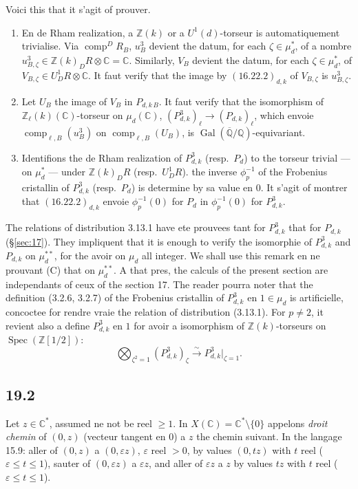 \documentclass[12pt,a4paper]{article}
\theoremstyle{plain}
\theoremstyle{definition}
\theoremstyle{remark}
\DeclareMathOperator{\Spec}{Spec}
\DeclareMathOperator{\Gal}{Gal}
\DeclareMathOperator{\comp}{comp}
\newcommand{\Betti}{B}
\newcommand{\dR}{DR}
\newcommand{\ZZ}{\mathbb{Z}}
\newcommand{\QQ}{\mathbb{Q}}
\newcommand{\CC}{\mathbb{C}}
\begin{document}
Voici this that it s'agit of prouver.
\begin{enumerate}
\item[(A)] En de Rham realization, a $\ZZ(k)$ or a
$U^1(d)$-torseur is automatiquement trivialise. Via
$\comp^\dR_\Betti$, $u^3_\Betti$ devient the datum, for each
$\zeta \in \mu_d^*$, of a nombre $u^3_{\Betti,\zeta} \in
\ZZ(k)_\dR \otimes \CC = \CC$. Similarly, $V_\Betti$ devient the
datum, for each $\zeta \in \mu_d^*$, of $V_{\Betti,\zeta} \in
U^1_\dR \otimes \CC$. It faut verify that the image by
$(16.22.2)_{d,k}$ of $V_{\Betti,\zeta}$ is $u^3_{\Betti,\zeta}$.
\item[(B)] Let $U_\Betti$ the image of $V_\Betti$ in
$P_{d,k\,\Betti}$. It faut verify that the isomorphism of
$\ZZ_\ell(k)(\CC)$-torseur on $\mu_d(\CC)$,
$(P^3_{d,k})_\ell \to (P_{d,k})_\ell$, which envoie
$\comp_{\ell,\Betti}(u^3_\Betti)$ on
$\comp_{\ell,\Betti}(U_\Betti)$, is $\Gal(\overline{\QQ}/\QQ)$-equivariant.
\item[(C)] Identifions the de Rham realization of $P^3_{d,k}$
(resp.\ $P_d$) to the torseur trivial --- on $\mu_d^*$ --- under
$\ZZ(k)_\dR$ (resp.\ $U^1_\dR$). the inverse $\phi_p^{-1}$ of the
Frobenius cristallin of $P^3_{d,k}$ (resp.\ $P_d$) is determine by
sa value en $0$. It s'agit of montrer that $(16.22.2)_{d,k}$ envoie
$\phi_p^{-1}(0)$ for $P_d$ in $\phi_p^{-1}(0)$ for $P^3_{d,k}$.
\end{enumerate}

The relations of distribution 3.13.1 have ete prouvees tant for
$P^3_{d,k}$ that for $P_{d,k}$ (\S\ref{sec:17}). They impliquent that it is enough to verify the isomorphie of $P^3_{d,k}$ and $P_{d,k}$ on
$\mu_d^{**}$, for the avoir on $\mu_d$ all integer. We shall use
this remark en ne prouvant (C) that on $\mu_d^{**}$. A that pres,
the calculs of the present section are independants of ceux of the
section 17. The reader pourra noter that the definition (3.2.6,
3.2.7) of the Frobenius cristallin of $P^3_{d,k}$ en $1 \in \mu_d$ is
artificielle, concoctee for rendre vraie the relation of distribution
(3.13.1). For $p \neq 2$, it revient also a define $P^3_{d,k}$
en $1$ for avoir a isomorphism of $\ZZ(k)$-torseurs on
$\Spec(\ZZ[1/2])$:
\[
\bigotimes_{\zeta^2=1} (P^3_{d,k})_\zeta \xrightarrow{\sim} P^3_{d,k}\big|_{\zeta=1}.
\]

\subsection{19.2}

Let $z \in \CC^*$, assumed ne not be reel $\geq 1$. In
$X(\CC) = \CC^* \setminus \{0\}$ appelons \textit{droit chemin} of
$(0,z)$ (vecteur tangent en $0$) a $z$ the chemin suivant. In the
langage 15.9: aller of $(0,z)$ a $(0,\varepsilon z)$, $\varepsilon$
reel $> 0$, by values $(0,tz)$ with $t$ reel ($\varepsilon \leq t
\leq 1$), sauter of $(0,\varepsilon z)$ a $\varepsilon z$, and aller of
$\varepsilon z$ a $z$ by values $tz$ with $t$ reel ($\varepsilon \leq t
\leq 1$).
\end{document}
